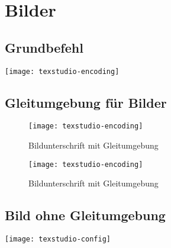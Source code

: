 % 
\chapter{Bilder}
	
	\section{Grundbefehl}
		\texttt{[image: texstudio-encoding]}
	
	\section{Gleitumgebung für Bilder}
		\begin{figure}[htb]									%
			\centering										%
			\texttt{[image: texstudio-encoding]}
			\caption{Bildunterschrift mit Gleitumgebung}	%
			\label{fig:figure}								%
		\end{figure}
		
		\begin{figure}[htb]
			\centering
			\texttt{[image: texstudio-encoding]}
			\caption{Bildunterschrift mit Gleitumgebung}
			\label{fig:figure2}
		\end{figure}
		
		\clearpage											%
	
	\section{Bild ohne Gleitumgebung}
		\texttt{[image: texstudio-config]}
